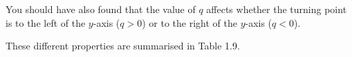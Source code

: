 You should have also found that the value of $q$ affects whether the turning point is to the left of the $y$-axis ($q>0$) or to the right of the $y$-axis ($q<0$).\par 
These different properties are summarised in Table 1.9.\par 
\setlength\mytablespace{6\tabcolsep}
\addtolength\mytablespace{4\arrayrulewidth}
\setlength\mytablewidth{\linewidth}
\setlength\mytableroom{\mytablewidth}
\addtolength\mytableroom{-\mytablespace}
\setlength\myfixedwidth{0pt}
\setlength\mystarwidth{\mytableroom}
\addtolength\mystarwidth{-\myfixedwidth}
\divide{}
